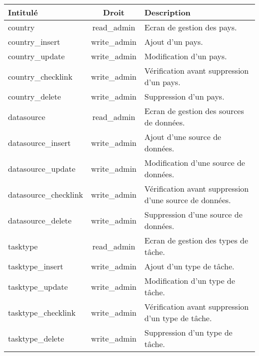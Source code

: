 \begin{tabular}{|l|c|p{9.5cm}|}
 \hline
 \textbf{Intitulé} & \textbf{Droit} & \textbf{Description} \\
 \hline
 \hline
  country & read\_admin & Ecran de gestion des pays.\\ 
 \hline
  country\_insert & write\_admin & Ajout d'un pays. \\
 \hline
  country\_update & write\_admin & Modification d'un pays. \\
 \hline
  country\_checklink & write\_admin & Vérification avant suppression d'un pays. \\
 \hline
  country\_delete & write\_admin & Suppression d'un pays. \\
 \hline
  datasource & read\_admin & Ecran de gestion des sources de données.\\ 
 \hline
  datasource\_insert & write\_admin & Ajout d'une source de données. \\
 \hline
  datasource\_update & write\_admin & Modification d'une source de données. \\
 \hline
  datasource\_checklink & write\_admin & Vérification avant suppression d'une source de données. \\
 \hline
  datasource\_delete & write\_admin & Suppression d'une source de données. \\
 \hline
  tasktype & read\_admin & Ecran de gestion des types de tâche.\\ 
 \hline
  tasktype\_insert & write\_admin & Ajout d'un type de tâche. \\
 \hline
  tasktype\_update & write\_admin & Modification d'un type de tâche. \\
 \hline
  tasktype\_checklink & write\_admin & Vérification avant suppression d'un type de tâche. \\
 \hline
  tasktype\_delete & write\_admin & Suppression d'un type de tâche. \\
 \hline
\end{tabular}
